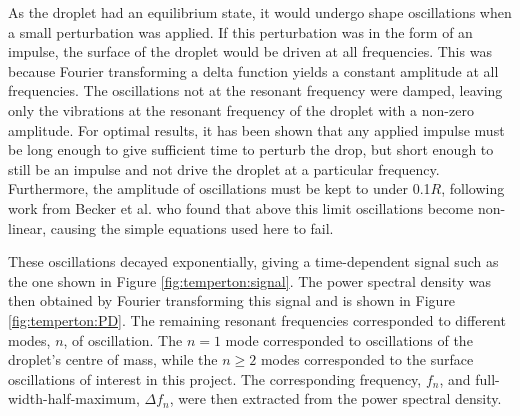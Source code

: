 \documentclass{physics_article_B}
\begin{document}
    As the droplet had an equilibrium state, it would undergo shape oscillations when a small perturbation was applied\cite{oscillate}. If this perturbation was in the form of an impulse, the surface of the droplet would be driven at all frequencies. This was because Fourier transforming a delta function yields a constant amplitude at all frequencies. The oscillations not at the resonant frequency were damped, leaving only the vibrations at the resonant frequency of the droplet with a non-zero amplitude. For optimal results, it has been shown that any applied impulse must be long enough to give sufficient time to perturb the drop, but short enough to still be an impulse and not drive the droplet at a particular frequency\cite{temperton}. Furthermore, the amplitude of oscillations must be kept to under 0.1$R$, following work from Becker et al. who found that above this limit oscillations become non-linear, causing the simple equations used here to fail\cite{becker}.
    
    These oscillations decayed exponentially, giving a time-dependent signal such as the one shown in Figure \ref{fig:temperton:signal}\cite{temperton}. The power spectral density was then obtained by Fourier transforming this signal and is shown in Figure \ref{fig:temperton:PD}. The remaining resonant frequencies corresponded to different modes, $n$, of oscillation. The $n=1$ mode corresponded to oscillations of the droplet's centre of mass\cite{miller}, while the $n\geq2$ modes corresponded to the surface oscillations of interest in this project. The corresponding frequency, $f_n$, and full-width-half-maximum, $\Delta f_n$, were then extracted from the power spectral density. 
\end{document}
